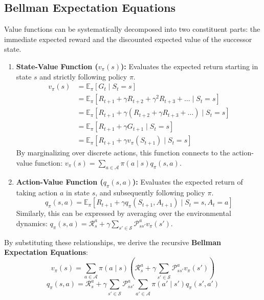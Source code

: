 \documentclass[a4paper]{scrartcl}
\begin{document}
\subsection{Bellman Expectation Equations}
Value functions can be systematically decomposed into two constituent parts: the immediate expected reward and the discounted expected value of the successor state. 
\begin{enumerate}
    \item \textbf{State-Value Function ($v_\pi(s)$):} Evaluates the expected return starting in state $s$ and strictly following policy $\pi$.
    \begin{equation}
    \begin{aligned}
    v_\pi(s) &= \mathbb{E}_\pi [G_t \mid S_t = s] \\
    &= \mathbb{E}_\pi [R_{t+1} + \gamma R_{t+2} + \gamma^2 R_{t+3} + \dots \mid S_t = s] \\
    &= \mathbb{E}_\pi [R_{t+1} + \gamma (R_{t+2} + \gamma R_{t+3} + \dots) \mid S_t = s] \\
    &= \mathbb{E}_\pi [R_{t+1} + \gamma G_{t+1} \mid S_t = s] \\
    &= \mathbb{E}_\pi [R_{t+1} + \gamma v_\pi(S_{t+1}) \mid S_t = s]
    \end{aligned}
    \end{equation}
    By marginalizing over discrete actions, this function connects to the action-value function: $v_\pi(s) = \sum_{a \in \mathcal{A}} \pi(a \mid s) q_\pi(s,a)$.

    \item \textbf{Action-Value Function ($q_\pi(s,a)$):} Evaluates the expected return of taking action $a$ in state $s$, and subsequently following policy $\pi$.
    \begin{equation}
    q_\pi(s,a) = \mathbb{E}_\pi[R_{t+1} + \gamma q_\pi(S_{t+1}, A_{t+1}) \mid S_t=s, A_t=a]
    \end{equation}
    Similarly, this can be expressed by averaging over the environmental dynamics: $q_\pi(s,a) = \mathcal{R}_s^a + \gamma \sum_{s' \in \mathcal{S}} \mathcal{P}_{ss'}^a v_\pi(s')$.
\end{enumerate}

By substituting these relationships, we derive the recursive \textbf{Bellman Expectation Equations}:
\begin{equation}
v_{\pi}(s) = \sum_{a \in \mathcal{A}} \pi(a \mid s) \left( \mathcal{R}_{s}^{a} + \gamma \sum_{s' \in \mathcal{S}} \mathcal{P}_{ss'}^{a} v_{\pi}(s') \right)
\end{equation}
\begin{equation}
q_{\pi}(s, a) = \mathcal{R}_{s}^{a} + \gamma \sum_{s' \in \mathcal{S}} \mathcal{P}_{ss'}^{a} \sum_{a' \in \mathcal{A}} \pi(a' \mid s') q_{\pi}(s', a')
\end{equation}
\end{document}
